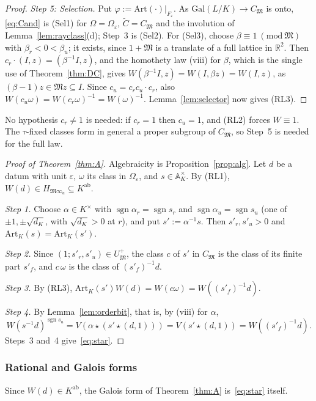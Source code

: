 \documentclass[11pt]{amsart}
\numberwithin{equation}{section}
\theoremstyle{plain}
\theoremstyle{definition}
\theoremstyle{remark}
\newcommand{\Kab}{K^{\mathrm{ab}}}
\begin{document}
\begin{proof}
\emph{Step 5: Selection.} Put \(\varphi:=\mathrm{Art}(\cdot)|_{F_\varepsilon}\). As \(\mathrm{Gal}(L/K)\to C_{\mathfrak M}\) is onto, \eqref{eq:Cand} is (Sel1) for \(\Omega=\Omega_\varepsilon\), \(\widetilde C=C_{\mathfrak M}\) and the involution of Lemma~\ref{lem:rayclass}(d); Step~3 is (Sel2). For (Sel3), choose \(\beta\equiv1\ (\mathrm{mod}\ \mathfrak M)\) with \(\beta_r<0<\beta_u\); it exists, since \(1+\mathfrak M\) is a translate of a full lattice in \(\mathbb R^2\). Then \(c_r\cdot(I,z)=(\beta^{-1}I,z)\), and the homothety law (viii) for \(\beta\), which is the single use of Theorem~\ref{thm:DC}, gives \(W(\beta^{-1}I,z)=W(I,\beta z)=W(I,z)\), as \((\beta-1)z\in\mathfrak Mz\subseteq I\). Since \(c_u=c_rc_u\cdot c_r\), also \(W(c_u\omega)=W(c_r\omega)^{-1}=W(\omega)^{-1}\). Lemma~\ref{lem:selector} now gives (RL3).
\end{proof}

No hypothesis \(c_r\ne1\) is needed: if \(c_r=1\) then \(c_u=1\), and (RL2) forces \(W\equiv1\). The \(\tau\)-fixed classes form in general a proper subgroup of \(C_{\mathfrak M}\), so Step~5 is needed for the full law.

\begin{proof}[Proof of Theorem~\ref{thm:A}]
Algebraicity is Proposition~\ref{prop:alg}. Let \(d\) be a datum with unit \(\varepsilon\), \(\omega\) its class in \(\Omega_\varepsilon\), and \(s\in\mathbb A_K^\times\). By (RL1), \(W(d)\in H_{\mathfrak M\infty_u}\subseteq\Kab\).

\emph{Step 1.} Choose \(\alpha\in K^\times\) with \(\operatorname{sgn}\alpha_r=\operatorname{sgn}s_r\) and \(\operatorname{sgn}\alpha_u=\operatorname{sgn}s_u\) (one of \(\pm1,\pm\sqrt{d_K}\), with \(\sqrt{d_K}>0\) at \(r\)), and put \(s':=\alpha^{-1}s\). Then \(s'_r,s'_u>0\) and \(\mathrm{Art}_K(s)=\mathrm{Art}_K(s')\).

\emph{Step 2.} Since \((1;s'_r,s'_u)\in U^+_{\mathfrak M}\), the class \(c\) of \(s'\) in \(C_{\mathfrak M}\) is the class of its finite part \(s'_f\), and \(c\,\omega\) is the class of \((s'_f)^{-1}d\).

\emph{Step 3.} By (RL3), \(\mathrm{Art}_K(s')W(d)=W(c\omega)=W((s'_f)^{-1}d)\).

\emph{Step 4.} By Lemma~\ref{lem:orderbit}, that is, by (viii) for \(\alpha\),
\[W(s^{-1}d)^{\operatorname{sgn}s_u}=V(\alpha\star(s'\star(d,1)))=V(s'\star(d,1))=W((s'_f)^{-1}d).\]
Steps~3 and~4 give~\eqref{eq:star}.
\end{proof}

\subsubsection*{Rational and Galois forms}
Since \(W(d)\in\Kab\), the Galois form of Theorem~\ref{thm:A} is~\eqref{eq:star} itself.
\end{document}

